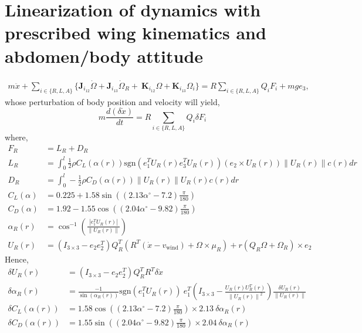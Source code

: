 \documentclass[10pt]{article}
\newcommand{\norm}[1]{\ensuremath{\left\| #1 \right\|}}
\begin{document}
\section{Linearization of dynamics with prescribed wing kinematics and abdomen/body attitude}

\begin{align*}
m\ddot x + 
\sum_{i\in\{R,L,A\}} \big\{ \mathbf{J}_{i_{12}} \dot\Omega + \mathbf{J}_{i_{13}}\dot\Omega_R 
+ \ \mathbf{K}_{i_{12}}\Omega + \mathbf{K}_{i_{13}}\Omega_i \big\} = R\sum_{i\in\{R,L,A\}} Q_i F_i + mg e_3,\label{eqn:mx_ddot}
\end{align*}
whose perturbation of body position and velocity will yield,
\begin{equation}
	m \frac{d (\delta \dot{x} )}{dt} = R \sum_{i\in\{R,L,A\}} Q_i \delta F_i
\end{equation}
where,
\begin{align*}
	F_R &= L_R + D_R \\
	L_R &= \int_{0}^{l} \frac{1}{2}\rho  C_L(\alpha(r)) \mathrm{sgn} (e_1^T U_R(r) e_3^T U_R(r)) (e_2\times U_R(r))\|U_R(r)\| c(r) dr \\
	D_R &= \int_{0}^{l} - \frac{1}{2}\rho  C_D(\alpha(r)) \|U_R(r)\|U_R(r) c(r) dr \\
	C_L(\alpha) & = 0.225 + 1.58 \sin( (2.13\alpha^\circ - 7.2) \frac{\pi}{180}) \\
	C_D(\alpha) & = 1.92 - 1.55 \cos( (2.04 \alpha^\circ - 9.82 ) \frac{\pi}{180}) \\
	\alpha_R (r) & = \cos^{-1} ( \frac{|e_1^T U_R(r)|}{\|U_R(r)\|} ) \\
	U_R(r) &= (I_{3\times 3}- e_2 e_2^T) Q_R^T( R^T (\dot x-v_{\mathrm{wind}}) + \Omega\times \mu_R ) + r  (Q_R\Omega + \Omega_R )\times e_2
\end{align*}
Hence,
\begin{align*}
	\delta U_R(r) &= (I_{3\times 3}- e_2 e_2^T) Q_R^T R^T \delta\dot x \\
	\delta \alpha_R(r) &= \frac{-1}{\sin(\alpha_R(r))} \mathrm{sgn}(e_1^T U_R(r))\ e_1^T\left(I_{3\times 3} - \frac{U_R(r)U_R^T(r)}{\norm{U_R(r)}^2}\right) \frac{\delta U_R(r)}{\norm{U_R(r)}} \\
	\delta C_L(\alpha(r)) &= 1.58 \cos( (2.13\alpha^\circ - 7.2) \frac{\pi}{180}) \times 2.13\ \delta\alpha_R(r) \\
	\delta C_D(\alpha(r)) &= 1.55 \sin( (2.04 \alpha^\circ - 9.82 ) \frac{\pi}{180}) \times 2.04\ \delta\alpha_R(r) \\
\end{align*}
\end{document}
